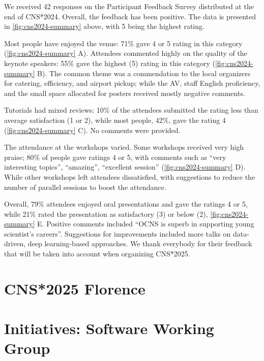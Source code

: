 \documentclass[11pt,a4paper,oneside]{article}
\begin{document}
\noindent{}We received 42 responses on the Participant Feedback Survey distributed at the end of CNS*2024.
Overall, the feedback has been positive. The data is presented in \cref{fig:cns2024-summary} above, with 5 being the highest rating.

Most people have enjoyed the venue: 71\% gave 4 or 5 rating in this category (\cref{fig:cns2024-summary} A).
Attendees commented highly on the quality of the keynote speakers: 55\% gave the highest (5) rating in this category (\cref{fig:cns2024-summary} B).
The common theme was a commendation to the local organizers for catering, efficiency, and airport pickup; while the AV, staff English proficiency, and the small space allocated for posters received mostly negative comments.

Tutorials had mixed reviews: 10\% of the attendees submitted the rating less than average satisfaction (1 or 2), while most people, 42\%, gave the rating 4 (\cref{fig:cns2024-summary} C). No comments were provided.

The attendance at the workshops varied.
Some workshops received very high praise; 80\% of people gave ratings 4 or 5, with comments such as \enquote{very interesting topics}, \enquote{amazing}, \enquote{excellent session} (\cref{fig:cns2024-summary} D).
While other workshops left attendees dissatisfied, with suggestions to reduce the number of parallel sessions to boost the attendance.

Overall, 79\% attendees enjoyed oral presentations and gave the ratings 4 or 5, while 21\% rated the presentation as satisfactory (3) or below (2), \cref{fig:cns2024-summary} E.
Positive comments included \enquote{OCNS is superb in supporting young scientist's careers}.
Suggestions for improvements included more talks on data-driven, deep learning-based approaches.
We thank everybody for their feedback that will be taken into account when organizing CNS*2025.


\newpage

\section*{CNS*2025 Florence}%
\lipsum[1-3]

\newpage
\section*{Initiatives: Software Working Group}%
\lipsum[1-3]
\end{document}

